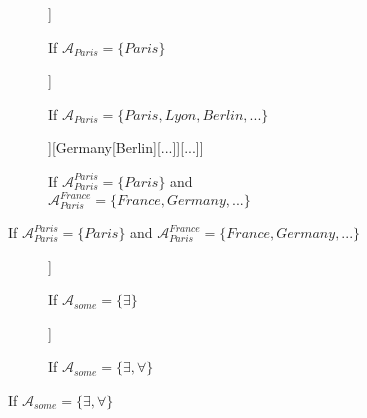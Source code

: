 	\begin{figure}[H]
		\centering
		\begin{subfigure}[b]{.2\linewidth}
			\centering
			\begin{forest}
				[CS[Paris][$\neg$Paris]]
			\end{forest}
			\caption{If $\mathcal{A}_{\textit{Paris}} = \lbrace \textit{Paris}\rbrace$}
		\end{subfigure}
		\hfill
		\begin{subfigure}[b]{.3\linewidth}
			\centering
			\begin{forest}
				[CS[Paris][Lyon][Berlin][...]]
			\end{forest}
			\caption{If $\mathcal{A}_{\textit{Paris}} = \lbrace \textit{Paris}, \textit{Lyon}, \textit{Berlin}, ...\rbrace$}
		\end{subfigure}
		\hfill
		\begin{subfigure}[b]{.45\linewidth}
			\centering
			\begin{forest}
				[CS[France[Paris][Lyon][...]][Germany[Berlin][...]][...]]
			\end{forest}
			\caption{If $\mathcal{A}_{\textit{Paris}}^{\textit{Paris}} = \lbrace \textit{Paris}\rbrace$ and  $\mathcal{A}_{\textit{Paris}}^{\textit{France}} = \lbrace \textit{France}, \textit{Germany}, ...\rbrace$}
		\end{subfigure}
	\end{figure}
	\begin{figure}[H]
		\centering
		\begin{subfigure}[b]{.2\linewidth}
			\centering
			\begin{forest}
				[CS[$\exists$][$\neg\exists$]]
			\end{forest}
			\caption{If $\mathcal{A}_{\textit{some}} = \lbrace\exists\rbrace$}
		\end{subfigure}
		\hfill
		\begin{subfigure}[b]{.3\linewidth}
			\centering
			\begin{forest}
				[CS[$\neg\exists$][\sbna][$\forall$]]
			\end{forest}
			\caption{If $\mathcal{A}_{\textit{some}} = \lbrace \exists, \forall\rbrace$}
		\end{subfigure}
	\end{figure}
